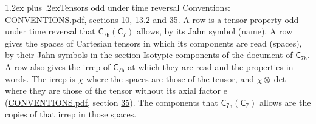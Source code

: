 \documentclass[10pt,a4paper]{article}
\makeatletter
\renewcommand\section{\@startsection{section}{1}{\z@}{-3ex plus -1ex minus -.2ex}%
  {1.2ex plus .2ex}{\normalfont\large\sffamily\bfseries\color{parttitle}}}
\numberwithin{equation}{section}
\newcommand{\grp}[1]{\mathsf{#1}}
\newcommand{\irrprod}{\otimes}
\makeatother
\begin{document}
\section{Tensors odd under time reversal}\label{s:time_odd}
Conventions: \href{../../CONVENTIONS.pdf}{CONVENTIONS.pdf}, sections \href{../../../rotation/CONVENTIONS.pdf\#conv.10}{10}, \href{../../../rotation/CONVENTIONS.pdf\#conv.13.2}{13.2} and \href{../../CONVENTIONS.pdf\#conv.35}{35}.
\leavevmode\label{n:head.name.property}A row is a tensor property odd under time reversal that $\grp{C_{7h}}(\grp{C_{7}})$ allows, by its Jahn symbol (name). \label{n:head.spaces}A row gives the spaces of Cartesian tensors in which its components are read (spaces), by their Jahn symbols in the section Isotypic components of the document of \href{../../../rotation/data/pdf/C7h.pdf}{$\grp{C_{7h}}$}. \label{n:head.properties}A row also gives the irrep of $\grp{C_{7h}}$ at which they are read and the properties in words. The irrep is $\chi$ where the spaces are those of the tensor, and $\chi \irrprod \det$ where they are those of the tensor without its axial factor e (\href{../../CONVENTIONS.pdf}{CONVENTIONS.pdf}, section \href{../../CONVENTIONS.pdf\#conv.35}{35}). The components that $\grp{C_{7h}}(\grp{C_{7}})$ allows are the copies of that irrep in those spaces.
\end{document}
